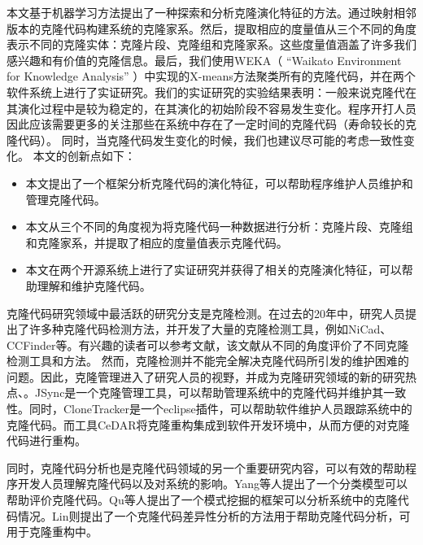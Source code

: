 本文基于机器学习方法提出了一种探索和分析克隆演化特征的方法。通过映射相邻版本的克隆代码构建系统的克隆家系。然后，提取相应的度量值从三个不同的角度表示不同的克隆实体：克隆片段、克隆组和克隆家系。这些度量值涵盖了许多我们感兴趣和有价值的克隆信息。最后，我们使用WEKA（ “Waikato Environment for Knowledge Analysis” \cite{hall2009weka}）中实现的X-means\cite{pelleg2000x}方法聚类所有的克隆代码，并在两个软件系统上进行了实证研究。我们的实证研究的实验结果表明：一般来说克隆代在其演化过程中是较为稳定的，在其演化的初始阶段不容易发生变化。程序开打人员因此应该需要更多的关注那些在系统中存在了一定时间的克隆代码（寿命较长的克隆代码）。
同时，当克隆代码发生变化的时候，我们也建议尽可能的考虑一致性变化。
本文的创新点如下：
\begin{itemize}
\item 本文提出了一个框架分析克隆代码的演化特征，可以帮助程序维护人员维护和管理克隆代码。
\item 本文从三个不同的角度视为将克隆代码一种数据进行分析：克隆片段、克隆组和克隆家系，并提取了相应的度量值表示克隆代码。
\item 本文在两个开源系统上进行了实证研究并获得了相关的克隆演化特征，可以帮助理解和维护克隆代码。
\end{itemize}

克隆代码研究领域中最活跃的研究分支是克隆检测。在过去的20年中，研究人员提出了许多种克隆代码检测方法，并开发了大量的克隆检测工具，例如NiCad\cite{roy2008nicad}、CCFinder\cite{kamiya2002ccfinder}等。有兴趣的读者可以参考文献\cite{rattan2013software}，该文献从不同的角度评价了不同克隆检测工具和方法。
然而，克隆检测并不能完全解决克隆代码所引发的维护困难的问题。因此，克隆管理进入了研究人员的视野，并成为克隆研究领域的新的研究热点\cite{roy2014vision}、\cite{koschke2012software}。JSync是一个克隆管理工具，可以帮助管理系统中的克隆代码并维护其一致性\cite{nguyen2012clone}。同时，CloneTracker是一个eclipse插件，可以帮助软件维护人员跟踪系统中的克隆代码\cite{duala2008clonetracker}。而工具CeDAR将克隆重构集成到软件开发环境中，从而方便的对克隆代码进行重构\cite{tairas2010representation}。

同时，克隆代码分析也是克隆代码领域的另一个重要研究内容，可以有效的帮助程序开发人员理解克隆代码以及对系统的影响。Yang等人提出了一个分类模型可以帮助评价克隆代码\cite{yang2015classification}。Qu等人提出了一个模式挖掘的框架可以分析系统中的克隆代码情况\cite{qu2014pattern}。Lin则提出了一个克隆代码差异性分析的方法用于帮助克隆代码分析，可用于克隆重构中\cite{lin2014detecting}。


